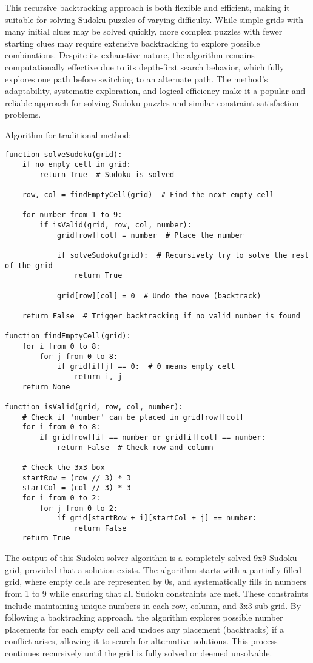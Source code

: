 \documentclass[conference]{IEEEtran}
\begin{document}
This recursive backtracking approach is both flexible and efficient, making it suitable for solving Sudoku puzzles of varying difficulty. While simple grids with many initial clues may be solved quickly, more complex puzzles with fewer starting clues may require extensive backtracking to explore possible combinations. Despite its exhaustive nature, the algorithm remains computationally effective due to its depth-first search behavior, which fully explores one path before switching to an alternate path. The method's adaptability, systematic exploration, and logical efficiency make it a popular and reliable approach for solving Sudoku puzzles and similar constraint satisfaction problems.  

Algorithm for traditional method:
\begin{lstlisting}[style=codebox, caption=Backtracking Sudoku Solving by Traditional Approach, label=lst:fourqueens]
function solveSudoku(grid):  
    if no empty cell in grid:  
        return True  # Sudoku is solved  

    row, col = findEmptyCell(grid)  # Find the next empty cell  

    for number from 1 to 9:  
        if isValid(grid, row, col, number):  
            grid[row][col] = number  # Place the number  

            if solveSudoku(grid):  # Recursively try to solve the rest of the grid  
                return True  

            grid[row][col] = 0  # Undo the move (backtrack)  

    return False  # Trigger backtracking if no valid number is found  

function findEmptyCell(grid):  
    for i from 0 to 8:  
        for j from 0 to 8:  
            if grid[i][j] == 0:  # 0 means empty cell  
                return i, j  
    return None  

function isValid(grid, row, col, number):  
    # Check if 'number' can be placed in grid[row][col]  
    for i from 0 to 8:  
        if grid[row][i] == number or grid[i][col] == number:  
            return False  # Check row and column  
          
    # Check the 3x3 box  
    startRow = (row // 3) * 3  
    startCol = (col // 3) * 3  
    for i from 0 to 2:  
        for j from 0 to 2:  
            if grid[startRow + i][startCol + j] == number:  
                return False  
    return True  
\end{lstlisting}
The output of this Sudoku solver algorithm is a completely solved 9x9 Sudoku grid, provided that a solution exists. The algorithm starts with a partially filled grid, where empty cells are represented by 0s, and systematically fills in numbers from 1 to 9 while ensuring that all Sudoku constraints are met. These constraints include maintaining unique numbers in each row, column, and 3x3 sub-grid. By following a backtracking approach, the algorithm explores possible number placements for each empty cell and undoes any placement (backtracks) if a conflict arises, allowing it to search for alternative solutions. This process continues recursively until the grid is fully solved or deemed unsolvable.
\end{document}
